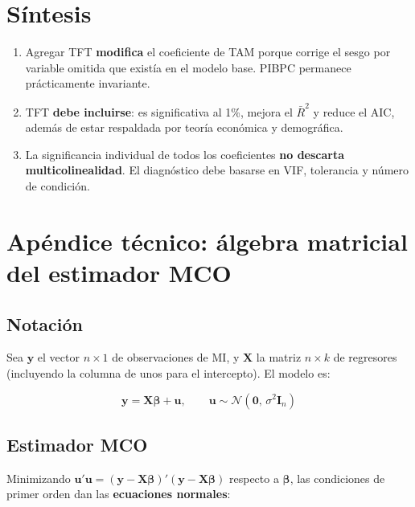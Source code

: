 \documentclass[12pt, letterpaper]{article}
\begin{document}
\section{Síntesis}

\begin{enumerate}[leftmargin=1.8em, itemsep=6pt]
  \item Agregar TFT \textbf{modifica} el coeficiente de TAM porque corrige el
    sesgo por variable omitida que existía en el modelo base. PIBPC permanece
    prácticamente invariante.

  \item TFT \textbf{debe incluirse}: es significativa al 1\%, mejora el $\bar{R}^2$
    y reduce el AIC, además de estar respaldada por teoría económica y demográfica.

  \item La significancia individual de todos los coeficientes \textbf{no descarta
    multicolinealidad}. El diagnóstico debe basarse en VIF, tolerancia y número
    de condición.
\end{enumerate}

\appendix
\section{Apéndice técnico: álgebra matricial del estimador MCO}

\subsection{Notación}

Sea $\mathbf{y}$ el vector $n\times 1$ de observaciones de MI, y
$\mathbf{X}$ la matriz $n\times k$ de regresores (incluyendo la columna de unos
para el intercepto). El modelo es:

\begin{equation}
  \mathbf{y} = \mathbf{X}\boldsymbol{\beta} + \mathbf{u},
  \qquad \mathbf{u} \sim \mathcal{N}(\mathbf{0},\, \sigma^2 \mathbf{I}_n)
  \label{eq:modelo_matricial}
\end{equation}

\subsection{Estimador MCO}

Minimizando $\mathbf{u'u} = (\mathbf{y}-\mathbf{X}\boldsymbol{\beta})'(\mathbf{y}-\mathbf{X}\boldsymbol{\beta})$
respecto a $\boldsymbol{\beta}$, las condiciones de primer orden dan las
\textbf{ecuaciones normales}:
\end{document}
